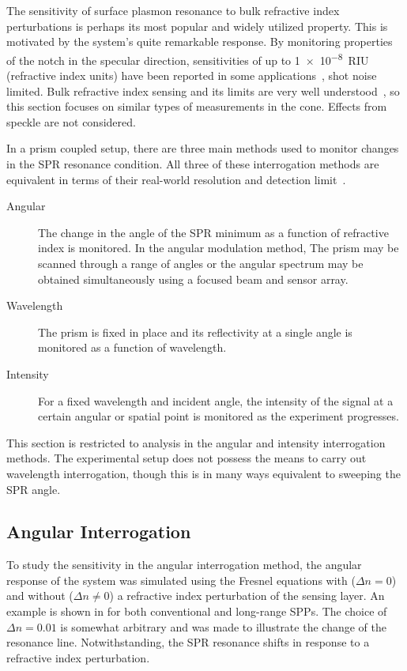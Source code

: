The sensitivity of surface plasmon resonance to bulk refractive index
perturbations is perhaps its most popular and widely utilized property.
This is motivated by the system's quite remarkable response. By monitoring
properties of the notch in the specular direction, sensitivities of up to
\SI{1e-8}{RIU} (refractive index units) have been reported in some
applications~\cite{fan2008sensitive}, shot noise limited.  Bulk refractive
index sensing and its limits are very well
understood~\cite{piliarik2009surface}, so this section focuses on similar
types of measurements in the cone.  Effects from speckle are not considered.

In a prism coupled setup, there are three main methods used to monitor changes
in the SPR resonance condition.  All three of these interrogation methods are
equivalent in terms of their real-world resolution and detection
limit~\cite{homola2006surface}.
\begin{description}
	\item [{Angular}] The change in the angle of the SPR minimum as a function
					of refractive index is monitored.  In the angular modulation method,
					The prism may be scanned through a range of angles or the angular
					spectrum may be obtained simultaneously using a focused beam and
					sensor array.
 \item [{Wavelength}] The prism is fixed in place and its reflectivity at
  a single angle is monitored as a function of wavelength.
	\item [{Intensity}] For a fixed wavelength and incident angle, the
		intensity of the signal at a certain angular or spatial point is
		monitored as the experiment progresses.
\end{description}
This section is restricted to analysis in the angular and intensity
interrogation methods.  The experimental setup does not possess the means to
carry out wavelength interrogation, though this is in many ways equivalent to
sweeping the SPR angle. 

\subsection{Angular Interrogation}
To study the sensitivity in the angular interrogation method, the angular
response of the system was simulated using the Fresnel equations with ($\Delta
n = 0$) and without ($\Delta n \ne 0$) a refractive index perturbation of the
sensing layer.  An example is shown in  for both
conventional and long-range SPPs.  The choice of $\Delta n = 0.01$ is somewhat
arbitrary and was made to illustrate the change of the resonance line.
Notwithstanding, the SPR resonance shifts in response to a refractive index
perturbation.

